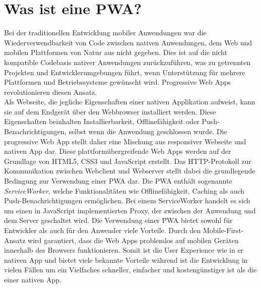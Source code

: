 \section{Was ist eine PWA?}
Bei der traditionellen Entwicklung mobiler Anwendungen war die Wiederverwendbarkeit von Code zwischen nativen Anwendungen, dem Web und mobilen Plattformen von Natur aus nicht gegeben. Dies ist auf die nicht kompatible Codebasis nativer Anwendungen zurückzuführen, was zu getrennten Projekten und Entwicklerumgebungen führt, wenn Unterstützung für mehrere Plattformen und Betriebssysteme gewünscht wird.\autocite[vgl.][]{Maj}
Progressive Web Apps revolutionieren diesen Ansatz.\\
Als Webseite, die jegliche Eigenschaften einer nativen Applikation aufweist, kann sie auf dem Endgerät über den Webbrowser installiert werden. Diese Eigenschaften beinhalten Installierbarkeit, Offlinefähigkeit oder Push-Benachrichtigungen, selbst wenn die Anwendung geschlossen wurde. Die progressive Web App stellt daher eine Mischung aus responsiver Webseite und nativen App dar.
Diese plattformübergreifende Web Apps werden auf der Grundlage von HTML5, CSS3 und JavaScript erstellt. Das HTTP-Protokoll zur Kommunikation zwischen Webclient und Webserver stellt dabei die grundlegende Bedingung zur Verwendung einer PWA dar.
Die PWA enthält sogenannte \textit{ServiceWorker}, welche Funktionalitäten wie Offlinefähigkeit, Caching als auch Push-Benachrichtigungen ermöglichen. Bei einem ServiceWorker handelt es sich um einen in JavaScript implementierten Proxy, der zwischen der Anwendung und dem Server geschaltet wird.\autocite[vgl.][]{Hume}
Die Verwendung einer PWA bietet sowohl für Entwickler als auch für den Anwender viele Vorteile. Durch den Mobile-First-Ansatz wird garantiert, dass die Web Apps problemlos auf mobilen Geräten innerhalb des Browsers funktionieren. Somit ist die User Experience wie in er nativen App und bietet viele bekannte Vorteile während ist die Entwicklung in vielen Fällen um ein Vielfaches schneller, einfacher und kostengünstiger ist als die einer nativen App.

